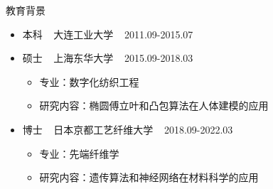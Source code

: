 \documentclass{beamer}
\begin{document}
\begin{frame}{教育背景}
	\begin{itemize}
		\item 本科 \textcolor{white}{e} 大连工业大学 \textcolor{white}{e}
			2011.09-2015.07
		\item 硕士 \textcolor{white}{e} 上海东华大学  \textcolor{white}{e}
			2015.09-2018.03
			\begin{itemize}
				\item 专业：数字化纺织工程
				\item 研究内容：椭圆傅立叶和凸包算法在人体建模的应用 
			\end{itemize}
		\item 博士 \textcolor{white}{e} 日本京都工艺纤维大学 \textcolor{white}{e}
			2018.09-2022.03
			\begin{itemize}
				\item 专业：先端纤维学
				\item 研究内容：遗传算法和神经网络在材料科学的应用 
			\end{itemize}
	\end{itemize}
\end{frame}

\end{document}
